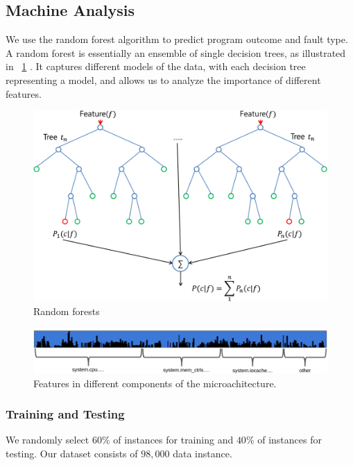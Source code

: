 
\subsection{Machine Analysis}\label{section:ML}
We use the random forest algorithm to predict program outcome and fault type. A random forest is essentially an ensemble of single decision trees, as illustrated in ~\ref{fig:rf} \cite{breiman2001random}. It captures different models of the data, with each decision tree representing a model, and allows us to analyze the importance of different features. 

\begin{figure}[t]
\begin{center}
   \includegraphics[width=0.95\linewidth]{./figures/rf.png}
\end{center}
   \caption{\footnotesize Random forests}
\label{fig:rf}
\end{figure}


\begin{figure}[t]
\begin{center}
   \includegraphics[width=0.95\linewidth]{./figures/feat_dist.png}
\end{center}
   \caption{\footnotesize Features in different components of the microachitecture.}
\label{fig:feat-dist}
\end{figure}

\subsubsection{Training and Testing}
We randomly select $60\%$ of instances for training and $40\%$ of instances for testing. Our dataset consists of $98,000$ data instance.
